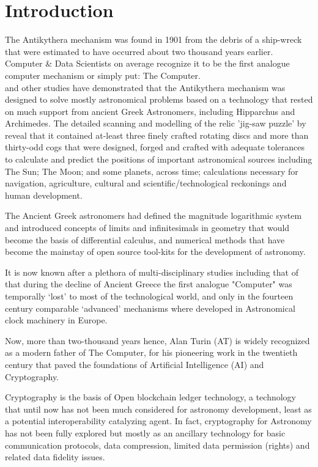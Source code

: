 \documentclass[final,5p,times,twocolumn,authoryear]{elsarticle}
\begin{document}
\section{Introduction}
\label{sec:intro}
%
 The Antikythera mechanism was found in 1901 from the debris of a ship-wreck that were estimated to have occurred about two thousand years earlier. Computer \& Data Scientists on average recognize it to be the first analogue computer mechanism or simply put: The Computer.\\ \citet{Freeth2021} and other studies have demonstrated that the Antikythera mechanism was designed to solve mostly astronomical problems based on a technology that rested on much support from ancient Greek Astronomers, including Hipparchus and Archimedes. The detailed scanning and modelling of the relic 'jig-saw puzzle' by \citet{Freeth2021} reveal that it contained at-least three finely crafted rotating discs and more than thirty-odd cogs that were designed, forged and crafted with adequate tolerances to calculate and predict the positions of important astronomical sources including The Sun; The Moon; and some planets, across time; calculations necessary for navigation, agriculture, cultural and scientific/technological reckonings and human development.
 
 The Ancient Greek astronomers had defined the magnitude logarithmic system and introduced concepts of limits and infinitesimals in geometry that would become the basis of differential calculus, and numerical methods that have become the mainstay of open source tool-kits for the development of astronomy.
 
 It is now known after a plethora of multi-disciplinary studies including that of \citet{Freeth2021} that during the decline of Ancient Greece the first analogue "Computer" was temporally `lost' to most of the technological world, and only in the fourteen century comparable `advanced' mechanisms where developed in Astronomical clock machinery in Europe. 
 
 Now, more than two-thousand years hence, Alan Turin (AT) is widely recognized as a modern father of The Computer, for his pioneering  work in the twentieth century that paved the foundations of Artificial Intelligence (AI) and Cryptography. 
 
Cryptography is the basis of Open blockchain ledger technology, a technology that until now has not been much considered for astronomy development, least as a potential interoperability catalyzing agent. In fact, cryptography for Astronomy has not been fully explored but mostly as an ancillary technology for basic communication protocols,  data compression, limited data permission (rights) and related data fidelity issues.
\end{document}
